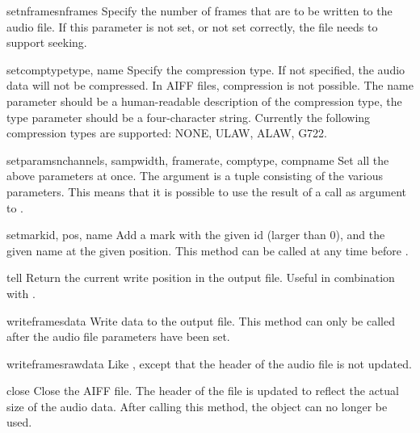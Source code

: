 \begin{methoddesc}[aifc]{setnframes}{nframes}
Specify the number of frames that are to be written to the audio file.
If this parameter is not set, or not set correctly, the file needs to
support seeking.
\end{methoddesc}

\begin{methoddesc}[aifc]{setcomptype}{type, name}
Specify the compression type.  If not specified, the audio data will
not be compressed.  In AIFF files, compression is not possible.  The
name parameter should be a human-readable description of the
compression type, the type parameter should be a four-character
string.  Currently the following compression types are supported:
NONE, ULAW, ALAW, G722.
\end{methoddesc}

\begin{methoddesc}[aifc]{setparams}{nchannels, sampwidth, framerate, comptype, compname}
Set all the above parameters at once.  The argument is a tuple
consisting of the various parameters.  This means that it is possible
to use the result of a  call as argument to
.
\end{methoddesc}

\begin{methoddesc}[aifc]{setmark}{id, pos, name}
Add a mark with the given id (larger than 0), and the given name at
the given position.  This method can be called at any time before
.
\end{methoddesc}

\begin{methoddesc}[aifc]{tell}{}
Return the current write position in the output file.  Useful in
combination with .
\end{methoddesc}

\begin{methoddesc}[aifc]{writeframes}{data}
Write data to the output file.  This method can only be called after
the audio file parameters have been set.
\end{methoddesc}

\begin{methoddesc}[aifc]{writeframesraw}{data}
Like , except that the header of the audio file
is not updated.
\end{methoddesc}

\begin{methoddesc}[aifc]{close}{}
Close the AIFF file.  The header of the file is updated to reflect the
actual size of the audio data. After calling this method, the object
can no longer be used.
\end{methoddesc}

